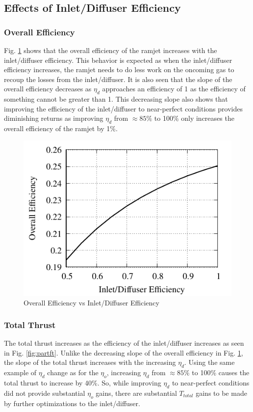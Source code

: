 \documentclass[conf]{new-aiaa} %
\begin{document}
\subsection{Effects of Inlet/Diffuser Efficiency} %

\subsubsection{Overall Efficiency}
Fig. \ref{fig:partfetao} shows that the overall efficiency of the ramjet increases with the inlet/diffuser efficiency. This behavior is expected as when the inlet/diffuser efficiency increases, the ramjet needs to do less work on the oncoming gas to recoup the losses from the inlet/diffuser. It is also seen that the slope of the overall efficiency decreases as $\eta_d$ approaches an efficiency of 1 as the efficiency of something cannot be greater than 1. This decreasing slope also shows that improving the efficiency of the inlet/diffuser to near-perfect conditions provides diminishing returns as improving $\eta_d$ from $\approx85\%$ to 100\% only increases the overall efficiency of the ramjet by 1\%.

\begin{figure}[H] %
    \centering
    \includegraphics[]{media/performance_parameter_files/part_f_eta_o.pdf}
    \caption{\label{fig:partfetao}Overall Efficiency vs Inlet/Diffuser Efficiency}
\end{figure}

\subsubsection{Total Thrust}
The total thrust increases as the efficiency of the inlet/diffuser increases as seen in Fig. \ref{fig:partft}. Unlike the decreasing slope of the overall efficiency in Fig. \ref{fig:partfetao}, the slope of the total thrust increases with the increasing $\eta_d$. Using the same example of $\eta_d$ change as for the $\eta_o$, increasing $\eta_d$ from $\approx85\%$ to 100\% causes the total thrust to increase by 40\%. So, while improving $\eta_d$ to near-perfect conditions did not provide substantial $\eta_o$ gains, there are substantial $T_{total}$ gains to be made by further optimizations to the inlet/diffuser.
\end{document}
